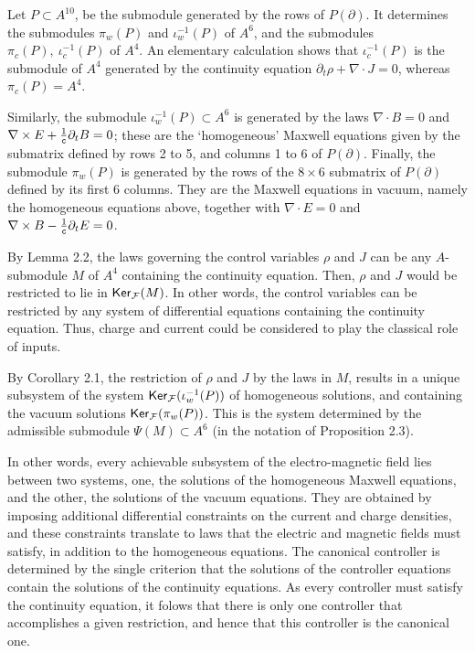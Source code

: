 \documentclass[11pt]{amsart}
\def\ker{\mathop{\sf Ker}}
\newcommand{\del}{\partial}
\newcommand{\F}{\mathcal{F}}
\begin{document}
{Let $P \subset A^{10}$, be the submodule generated by the rows of $P(\del)$.  It determines the submodules $\pi_w(P)$ and $\iota_w^{-1}(P)$ of $A^6$, and the submodules $\pi_c(P), ~\iota_c^{-1}(P)$ of $A^4$. An elementary calculation shows that $\iota_c^{-1}(P)$ is the submodule of $A^4$ generated by the continuity equation $\del_t \rho + \nabla \cdot J = 0$, whereas $\pi_c(P) = A^4$. 

Similarly, the submodule $\iota_w^{-1}(P) \subset A^6$ is generated by the laws $\nabla \cdot B = 0$ and $\nabla \times E + \frac{1}{\tt{c}}\del_t B = 0$; these are the `homogeneous' Maxwell equations given by the submatrix defined by rows 2 to 5, and columns 1 to 6 of $P(\del)$. Finally, the submodule $\pi_w(P)$ is generated by the rows of the $8 \times 6$ submatrix of $P(\del)$ defined by its first 6 columns. They are the Maxwell equations in vacuum, namely the homogeneous equations above, together with $\nabla \cdot E = 0$ and $\nabla \times B - \frac{1}{\tt{c}} \del_t E = 0$. 
 
By Lemma 2.2, the laws governing the control variables $\rho$ and $J$ can be any $A$-submodule $M$ of $A^4$ containing the continuity equation. Then, $\rho$ and $J$ would be restricted to lie in $\ker_\F(M)$. In other words, the control variables can be restricted by any system of differential equations containing the continuity equation. Thus, charge and current could be considered to play the classical role of inputs.

By Corollary 2.1, the restriction of $\rho$ and $J$ by the laws in $M$, results in a unique subsystem of the system $\ker_\F(\iota_w^{-1}(P))$ of homogeneous solutions, and containing the vacuum solutions $\ker_\F(\pi_w(P))$. This is the system determined by the admissible submodule $\Psi(M) \subset A^6$ (in the notation of Proposition 2.3). 

In other words, every achievable subsystem of the electro-magnetic field lies between two systems, one, the solutions of the homogeneous Maxwell equations, and the other, the solutions of the vacuum equations. They are
obtained by imposing additional differential constraints on the current and charge densities, and these constraints translate to laws that the electric and magnetic fields must satisfy, in addition to the homogeneous equations. The canonical controller is determined by  the single criterion that the solutions of the controller equations contain the solutions of the continuity equations. As every controller must satisfy the continuity equation, it folows that there is only one controller that accomplishes a given restriction, and hence that this controller is the canonical one.\\

}
\end{document}
